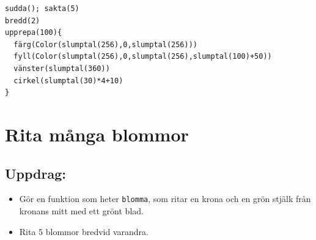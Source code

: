   

\begin{lstlisting}[basicstyle={\ttfamily\fontsize{16}{19}\selectfont},numbers=none]
sudda(); sakta(5)
bredd(2)
upprepa(100){
  färg(Color(slumptal(256),0,slumptal(256)))
  fyll(Color(slumptal(256),0,slumptal(256),slumptal(100)+50))
  vänster(slumptal(360))
  cirkel(slumptal(30)*4+10)
}
\end{lstlisting}
        
\chapter{Rita många blommor}\section*{\color{BrickRed}Uppdrag:}


\begin{itemize}

\item {Gör en funktion som heter \lstinline{blomma}, som ritar en krona och en grön stjälk från kronans mitt med ett grönt blad.}
\item {Rita 5 blommor bredvid varandra.}

\end{itemize}



  
